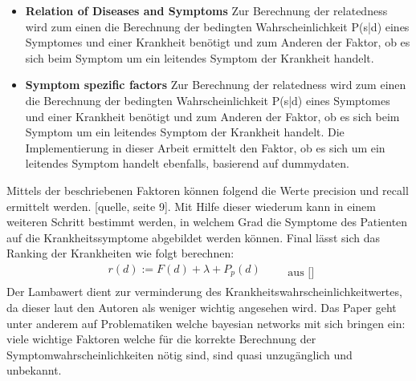 \begin{itemize}
	\item \textbf{Relation of Diseases and Symptoms}
	\newline
	Zur Berechnung der relatedness wird zum einen die Berechnung der bedingten Wahrscheinlichkeit P(s|d) eines Symptomes und einer Krankheit benötigt und zum Anderen der Faktor, ob es sich beim Symptom um ein leitendes Symptom der Krankheit handelt. 
	
	\item \textbf{Symptom spezific factors}
	\newline
	Zur Berechnung der relatedness wird zum einen die Berechnung der bedingten Wahrscheinlichkeit P(s|d) eines Symptomes und einer Krankheit benötigt und zum Anderen der Faktor, ob es sich beim Symptom um ein leitendes Symptom der Krankheit handelt. Die Implementierung in dieser Arbeit ermittelt den Faktor, ob es sich um ein leitendes Symptom handelt ebenfalls, basierend auf dummydaten.
\end{itemize}
\noindent
Mittels der beschriebenen Faktoren können folgend die Werte precision und recall ermittelt werden. [quelle, seite 9]. Mit Hilfe dieser wiederum kann in einem weiteren Schritt bestimmt werden, in welchem Grad die Symptome des Patienten auf die Krankheitssymptome abgebildet werden können. Final lässt sich das Ranking der Krankheiten wie folgt berechnen:
\begin{equation}
	  \begin{aligned}
		r(d) := F(d) + \lambda + P_p(d)\\
	 \end{aligned}\qquad\text{aus []}
\end{equation}
Der Lambawert dient zur verminderung des Krankheitswahrscheinlichkeitwertes, da dieser laut den Autoren als weniger wichtig angesehen wird. 
\newline
\noindent
Das Paper geht unter anderem auf Problematiken welche bayesian networks mit sich bringen ein: viele wichtige Faktoren welche für die korrekte Berechnung der Symptomwahrscheinlichkeiten nötig sind, sind quasi unzugänglich und unbekannt. 

